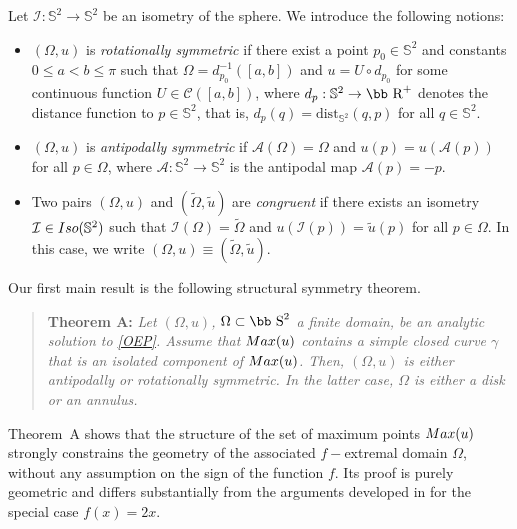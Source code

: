 \documentclass[11pt]{article}
\def\r{\hbox{\bb R}}
\def\s{\hbox{\bb S}}
\newcommand{\Max}{\textup{Max}}
\numberwithin{equation} {section}
\begin{document}
Let \(\mathcal{I}: \mathbb{S}^2 \to \mathbb{S}^2\) be an isometry of the sphere. We introduce the following notions:

\begin{itemize}

\item 
$(\Omega,u)$ is {\it rotationally symmetric} if there exist a point $p_0\in\mathbb{S}^2$ and constants 
$0\leq a<b\leq\pi$ such that $\Omega=d_{p_0}^{-1}([a,b])$ and 
$u=U\circ d_{p_0}$ for some continuous function $U\in\mathcal{C}([a,b])$, 
where $d_p:\mathbb{S}^2\to\r^+$ denotes the distance function to $p\in\mathbb{S}^2$, 
that is, $d_p(q)=\mathrm{dist}_{\mathbb{S}^2}(q,p)$ for all $q\in\mathbb{S}^2$.

\item 
$(\Omega,u)$ is {\it antipodally symmetric} if $\mathcal{A}(\Omega)=\Omega$ and 
$u(p)=u(\mathcal{A}(p))$ for all $p\in\Omega$, where $\mathcal{A}:\mathbb{S}^2\to\mathbb{S}^2$ 
is the antipodal map $\mathcal{A}(p)=-p$.

\item 
Two pairs $(\Omega,u)$ and $(\tilde\Omega,\tilde u)$ are {\it congruent} if there exists an isometry 
$\mathcal{I}\in{\rm Iso}(\mathbb{S}^2)$ such that $\mathcal{I}(\Omega)=\tilde\Omega$ and 
$u(\mathcal{I}(p))=\tilde u(p)$ for all $p\in\Omega$. 
In this case, we write $(\Omega,u)\equiv(\tilde\Omega,\tilde u)$.

\end{itemize}

Our first main result is the following structural symmetry theorem.

\begin{quote}
{\bf Theorem A:} {\it Let $(\Omega, u)$, $\Omega \subset \s^2$ a finite domain, be an analytic solution to \eqref{OEP}. Assume that $\Max(u)$ contains a simple closed curve $\gamma$ that is an isolated component of $\Max(u)$. Then, $(\Omega ,u)$ is either antipodally or rotationally symmetric. In the latter case, $\Omega$ is either a disk or an annulus.}
\end{quote}

Theorem~A shows that the structure of the set of maximum points $\Max(u)$ strongly constrains the geometry of the associated $f-$extremal domain $\Omega$, without any assumption on the sign of the function $f$. Its proof is purely geometric and differs substantially from the arguments developed in \cite{EMa} for the special case $f(x)=2x$.
\end{document}
